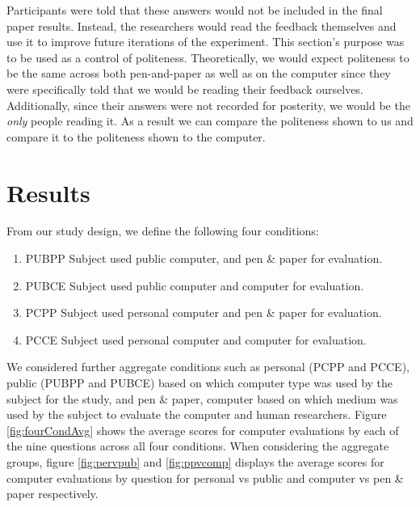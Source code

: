 \documentclass{sig-alternate-05-2015}
\begin{document}
Participants were told that these answers would not be included in the final paper results.  Instead, the researchers would read the feedback themselves and use it to improve future iterations of the experiment.  This section's purpose was to be used as a control of politeness.  Theoretically, we would expect politeness to be the same across both pen-and-paper as well as on the computer since they were specifically told that we would be reading their feedback ourselves.  Additionally, since their answers were not recorded for posterity, we would be the \textit{only} people reading it.  As a result we can compare the politeness shown to us and compare it to the politeness shown to the computer.

 
\section{Results}
From our study design, we define the following four conditions:\\
\begin{enumerate}
    \item{PUBPP} Subject used public computer, and pen \& paper for evaluation.
    \item{PUBCE} Subject used public computer and computer for evaluation.
    \item{PCPP} Subject used personal computer and pen \& paper for evaluation.
    \item{PCCE} Subject used personal computer and computer for evaluation.
\end{enumerate}

We considered further aggregate conditions such as personal (PCPP and PCCE), public (PUBPP and PUBCE) based on which computer type was used by the subject for the study, and pen \& paper, computer based on which medium was used by the subject to evaluate the computer and human researchers. Figure \ref{fig:fourCondAvg} shows the average scores for computer evaluations by each of the nine questions across all four conditions. When considering the aggregate groups, figure \ref{fig:pervpub} and \ref{fig:ppvcomp} displays the average scores for computer evaluations by question for personal vs public and computer vs pen \& paper respectively.
\end{document}
